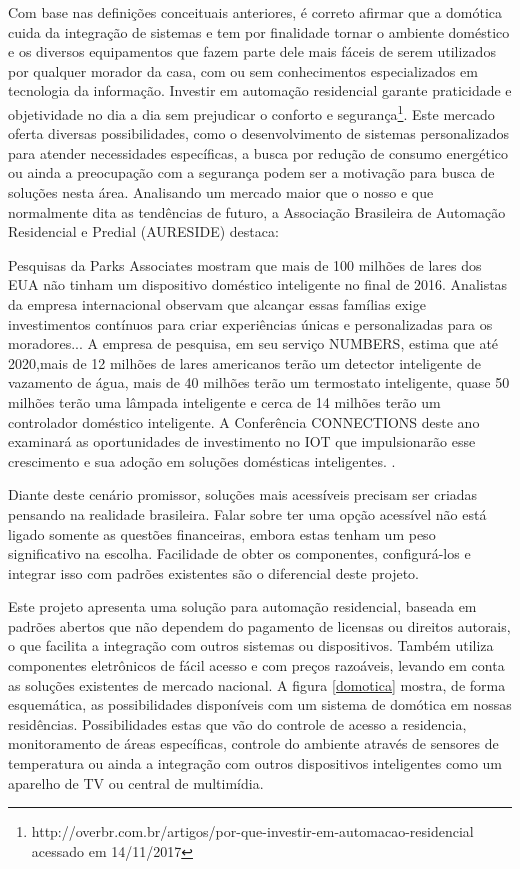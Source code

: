 Com base nas definições conceituais anteriores, é correto afirmar que a domótica cuida da integração de sistemas e tem por finalidade tornar o ambiente doméstico e os diversos equipamentos que fazem parte dele mais fáceis de serem utilizados por qualquer morador da casa, com ou sem conhecimentos especializados em tecnologia da informação. Investir em automação residencial garante praticidade e objetividade no dia a dia sem prejudicar o conforto e segurança\footnote{http://overbr.com.br/artigos/por-que-investir-em-automacao-residencial acessado em 14/11/2017}. Este mercado oferta diversas possibilidades, como o desenvolvimento de sistemas personalizados para atender necessidades específicas, a busca por redução de consumo energético ou ainda a preocupação com a segurança podem ser a motivação para busca de soluções nesta área. Analisando um mercado maior que o nosso e que normalmente dita as tendências de futuro, a Associação Brasileira de Automação Residencial e Predial (AURESIDE) destaca:

\begin{citacao}
Pesquisas da Parks Associates mostram que mais de 100 milhões de lares dos EUA não tinham um dispositivo doméstico inteligente no final de 2016. Analistas da empresa internacional observam que alcançar essas famílias exige investimentos contínuos para criar experiências únicas e personalizadas para os moradores... 
A empresa de pesquisa, em seu serviço NUMBERS, estima que até 2020,mais de 12 milhões de lares americanos terão um detector inteligente de vazamento de água, mais de 40 milhões terão um termostato inteligente, quase 50 milhões terão uma lâmpada inteligente e cerca de 14 milhões terão um controlador doméstico inteligente. A Conferência CONNECTIONS deste ano examinará as oportunidades de investimento no IOT que impulsionarão esse crescimento e sua adoção em soluções domésticas inteligentes. \cite{MERCADO}.
\end{citacao}

Diante deste cenário promissor, soluções mais acessíveis precisam ser criadas pensando na realidade brasileira. Falar sobre ter uma opção acessível não está ligado somente as questões financeiras, embora estas tenham um peso significativo na escolha. Facilidade de obter os componentes, configurá-los e integrar isso com padrões existentes são o diferencial deste projeto.

Este projeto apresenta uma solução para automação residencial, baseada em padrões abertos que não dependem do pagamento de licensas ou direitos autorais, o que facilita a integração com outros sistemas ou dispositivos. Também utiliza componentes eletrônicos de fácil acesso e com preços razoáveis, levando em conta as soluções existentes de mercado nacional. A figura \ref{domotica} mostra, de forma esquemática, as possibilidades disponíveis com um sistema de domótica em nossas residências. Possibilidades estas que vão do controle de acesso a residencia, monitoramento de áreas específicas, controle do ambiente através de sensores de temperatura ou ainda a integração com outros dispositivos inteligentes como um aparelho de TV ou central de multimídia.

